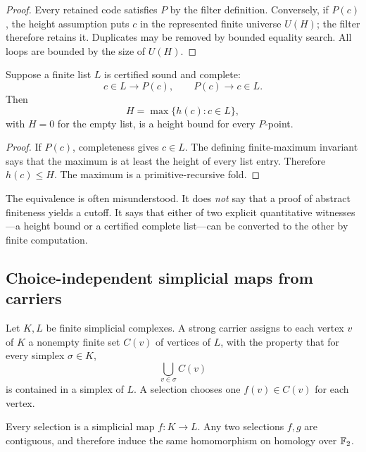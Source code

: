 \begin{proof}
Every retained code satisfies \(P\) by the filter definition.  Conversely, if
\(P(c)\), the height assumption puts \(c\) in the represented finite universe
\(U(H)\); the filter therefore retains it.  Duplicates may be removed by
bounded equality search.  All loops are bounded by the size of \(U(H)\).
\end{proof}

\begin{theorem}
Suppose a finite list \(L\) is certified sound and complete:
\[
  c\in L\to P(c),
  \qquad
  P(c)\to c\in L.
\]
Then
\[
        H=\max\{h(c):c\in L\},
\]
with \(H=0\) for the empty list, is a height bound for every \(P\)-point.
\end{theorem}

\begin{proof}
If \(P(c)\), completeness gives \(c\in L\).  The defining finite-maximum
invariant says that the maximum is at least the height of every list entry.
Therefore \(h(c)\le H\).  The maximum is a primitive-recursive fold.
\end{proof}

The equivalence is often misunderstood.  It does \emph{not} say that a proof
of abstract finiteness yields a cutoff.  It says that either of two explicit
quantitative witnesses---a height bound or a certified complete list---can be
converted to the other by finite computation.

\subsection{Choice-independent simplicial maps from carriers}

Let \(K,L\) be finite simplicial complexes.  A strong carrier assigns to each
vertex \(v\) of \(K\) a nonempty finite set \(C(v)\) of vertices of \(L\), with
the property that for every simplex \(\sigma\in K\),
\[
      \bigcup_{v\in\sigma} C(v)
\]
is contained in a simplex of \(L\).  A selection chooses one
\(f(v)\in C(v)\) for each vertex.

\begin{theorem}
Every selection is a simplicial map \(f:K\to L\).  Any two selections
\(f,g\) are contiguous, and therefore induce the same homomorphism on homology
over \(\mathbb F_2\).
\end{theorem}

